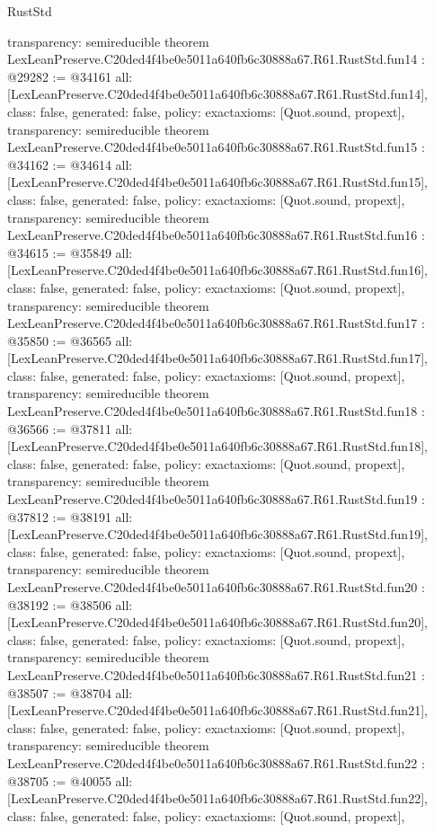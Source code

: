 \begin{lexlean}{RustStd}
\begin{coremodule}
{  transparency: semireducible
}
theorem LexLeanPreserve.C20ded4f4be0e5011a640fb6c30888a67.R61.RustStd.fun14 : @29282 := @34161 {
  all: [LexLeanPreserve.C20ded4f4be0e5011a640fb6c30888a67.R61.RustStd.fun14],
  class: false,
  generated: false,
  policy: exact{axioms: [Quot.sound, propext]},
  transparency: semireducible
}
theorem LexLeanPreserve.C20ded4f4be0e5011a640fb6c30888a67.R61.RustStd.fun15 : @34162 := @34614 {
  all: [LexLeanPreserve.C20ded4f4be0e5011a640fb6c30888a67.R61.RustStd.fun15],
  class: false,
  generated: false,
  policy: exact{axioms: [Quot.sound, propext]},
  transparency: semireducible
}
theorem LexLeanPreserve.C20ded4f4be0e5011a640fb6c30888a67.R61.RustStd.fun16 : @34615 := @35849 {
  all: [LexLeanPreserve.C20ded4f4be0e5011a640fb6c30888a67.R61.RustStd.fun16],
  class: false,
  generated: false,
  policy: exact{axioms: [Quot.sound, propext]},
  transparency: semireducible
}
theorem LexLeanPreserve.C20ded4f4be0e5011a640fb6c30888a67.R61.RustStd.fun17 : @35850 := @36565 {
  all: [LexLeanPreserve.C20ded4f4be0e5011a640fb6c30888a67.R61.RustStd.fun17],
  class: false,
  generated: false,
  policy: exact{axioms: [Quot.sound, propext]},
  transparency: semireducible
}
theorem LexLeanPreserve.C20ded4f4be0e5011a640fb6c30888a67.R61.RustStd.fun18 : @36566 := @37811 {
  all: [LexLeanPreserve.C20ded4f4be0e5011a640fb6c30888a67.R61.RustStd.fun18],
  class: false,
  generated: false,
  policy: exact{axioms: [Quot.sound, propext]},
  transparency: semireducible
}
theorem LexLeanPreserve.C20ded4f4be0e5011a640fb6c30888a67.R61.RustStd.fun19 : @37812 := @38191 {
  all: [LexLeanPreserve.C20ded4f4be0e5011a640fb6c30888a67.R61.RustStd.fun19],
  class: false,
  generated: false,
  policy: exact{axioms: [Quot.sound, propext]},
  transparency: semireducible
}
theorem LexLeanPreserve.C20ded4f4be0e5011a640fb6c30888a67.R61.RustStd.fun20 : @38192 := @38506 {
  all: [LexLeanPreserve.C20ded4f4be0e5011a640fb6c30888a67.R61.RustStd.fun20],
  class: false,
  generated: false,
  policy: exact{axioms: [Quot.sound, propext]},
  transparency: semireducible
}
theorem LexLeanPreserve.C20ded4f4be0e5011a640fb6c30888a67.R61.RustStd.fun21 : @38507 := @38704 {
  all: [LexLeanPreserve.C20ded4f4be0e5011a640fb6c30888a67.R61.RustStd.fun21],
  class: false,
  generated: false,
  policy: exact{axioms: [Quot.sound, propext]},
  transparency: semireducible
}
theorem LexLeanPreserve.C20ded4f4be0e5011a640fb6c30888a67.R61.RustStd.fun22 : @38705 := @40055 {
  all: [LexLeanPreserve.C20ded4f4be0e5011a640fb6c30888a67.R61.RustStd.fun22],
  class: false,
  generated: false,
  policy: exact{axioms: [Quot.sound, propext]},
}
\end{coremodule}
\end{lexlean}
